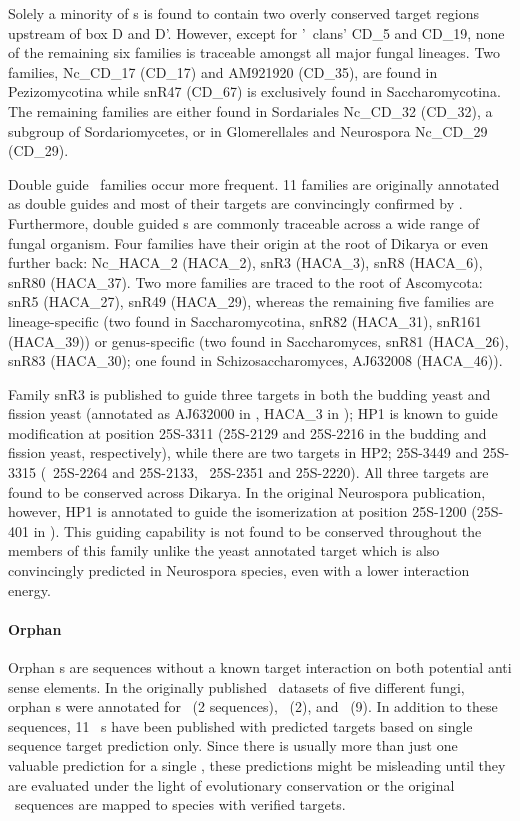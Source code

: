 Solely a minority of \cd s is found to contain two overly
conserved target regions upstream of box D and D'. However, except for '\sno\ clans'
CD\_5 and CD\_19, none of
the remaining six families is traceable amongst all major fungal
lineages. Two families, Nc\_CD\_17 (CD\_17) and  AM921920 (CD\_35), are found in Pezizomycotina
while snR47 (CD\_67) is exclusively found in Saccharomycotina. The remaining
families are either found in Sordariales Nc\_CD\_32 (CD\_32), a subgroup of
Sordariomycetes, or in Glomerellales and Neurospora Nc\_CD\_29 (CD\_29). 

Double guide \haca\ families occur more frequent. 11 families are originally annotated as
double guides and most of their targets are convincingly confirmed
by \snostrip. Furthermore, double guided \haca s are commonly traceable across a wide
range of fungal organism. Four families have their origin at the root of Dikarya or
even further back: Nc\_HACA\_2 (HACA\_2), snR3 (HACA\_3), snR8 (HACA\_6), snR80 (HACA\_37). Two more families are traced to the root of
Ascomycota: snR5 (HACA\_27), snR49 (HACA\_29), whereas the remaining five families are lineage-specific (two
found in Saccharomycotina, snR82 (HACA\_31), snR161 (HACA\_39)) or genus-specific (two found in
Saccharomyces, snR81 (HACA\_26), snR83 (HACA\_30); one found in Schizosaccharomyces,  AJ632008 (HACA\_46)).

Family snR3 is published to guide three targets in both the budding yeast
and fission yeast (annotated as AJ632000 in \spo, HACA\_3 in \snostrip); HP1 is known to guide modification at position 25S-3311 (25S-2129 and
25S-2216 in the budding and fission yeast, respectively), while there
are two targets in HP2; 25S-3449 and 25S-3315 (\sce\ 25S-2264 and
25S-2133, \spo\ 25S-2351 and 25S-2220). All three targets are found to
be conserved across Dikarya. In the original Neurospora publication,
however, HP1 is annotated to guide the isomerization at position
25S-1200 (25S-401 in \Ncr). This guiding capability is not found to be
conserved throughout the members of this family unlike the yeast
annotated target which is also convincingly predicted in Neurospora
species, even with a lower interaction energy. 

\paragraph{\textbf{Orphan \sno}}
Orphan \sno s are sequences without a known target interaction on both
potential anti sense elements. In the originally published \sno\ datasets of five different fungi, orphan \cd s were annotated for \sce\
(2 sequences), \ncr\ (2), and \afu\ (9). In addition to these sequences,
11 \ncr\ \sno s have been published with predicted targets
based on single sequence target prediction only. Since there is
usually more than just one valuable prediction for a single \sno, these predictions might be
misleading until they are evaluated under the light of
evolutionary conservation or the original \sno\ sequences are mapped to species with verified
targets.

